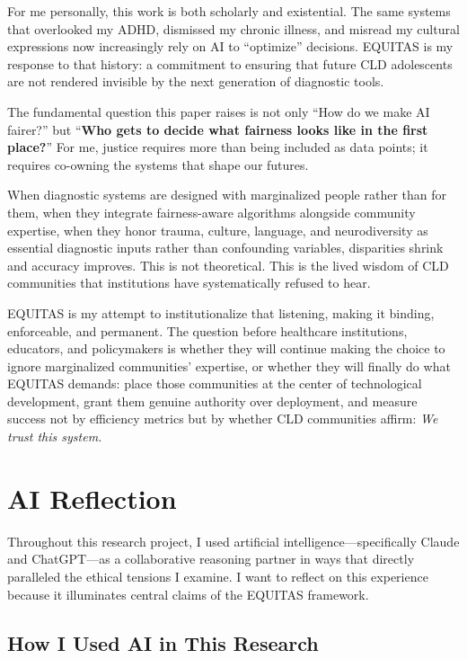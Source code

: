 \documentclass[12pt,a4paper]{article}
\begin{document}
For me personally, this work is both scholarly and existential. The same systems that overlooked my ADHD, dismissed my chronic illness, and misread my cultural expressions now increasingly rely on AI to ``optimize'' decisions. EQUITAS is my response to that history: a commitment to ensuring that future CLD adolescents are not rendered invisible by the next generation of diagnostic tools.

The fundamental question this paper raises is not only ``How do we make AI fairer?'' but ``\textbf{Who gets to decide what fairness looks like in the first place?}'' For me, justice requires more than being included as data points; it requires co-owning the systems that shape our futures.

When diagnostic systems are designed with marginalized people rather than for them, when they integrate fairness-aware algorithms alongside community expertise, when they honor trauma, culture, language, and neurodiversity as essential diagnostic inputs rather than confounding variables, disparities shrink and accuracy improves. This is not theoretical. This is the lived wisdom of CLD communities that institutions have systematically refused to hear.

EQUITAS is my attempt to institutionalize that listening, making it binding, enforceable, and permanent. The question before healthcare institutions, educators, and policymakers is whether they will continue making the choice to ignore marginalized communities' expertise, or whether they will finally do what EQUITAS demands: place those communities at the center of technological development, grant them genuine authority over deployment, and measure success not by efficiency metrics but by whether CLD communities affirm: \textit{We trust this system.}

\section{AI Reflection}

Throughout this research project, I used artificial intelligence---specifically Claude and ChatGPT---as a collaborative reasoning partner in ways that directly paralleled the ethical tensions I examine. I want to reflect on this experience because it illuminates central claims of the EQUITAS framework.

\subsection{How I Used AI in This Research}
\end{document}
